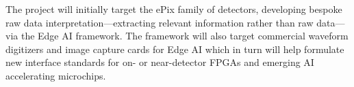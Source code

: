 \documentclass{article}
\begin{document}
The project will initially target the ePix family of detectors, developing bespoke raw data interpretation---extracting relevant information rather than raw data---via the Edge AI framework. 
The framework will also target commercial waveform digitizers and image capture cards for Edge AI which in turn will help formulate new interface standards for on- or near-detector FPGAs and emerging AI accelerating microchips.





\end{document}

